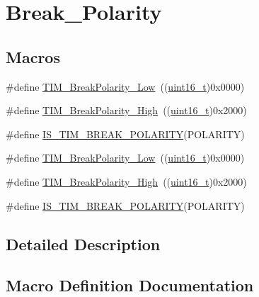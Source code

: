 \hypertarget{group___break___polarity}{}\section{Break\+\_\+\+Polarity}
\label{group___break___polarity}
\subsection*{Macros}
\begin{DoxyCompactItemize}
\item 
\#define \hyperlink{group___break___polarity_ga565656ca81d17f9a1807afe3971dff6e}{T\+I\+M\+\_\+\+Break\+Polarity\+\_\+\+Low}~((\hyperlink{_p_e___types_8h_a1f1825b69244eb3ad2c7165ddc99c956}{uint16\+\_\+t})0x0000)
\item 
\#define \hyperlink{group___break___polarity_gabd4b72079548fd8903413a348539542b}{T\+I\+M\+\_\+\+Break\+Polarity\+\_\+\+High}~((\hyperlink{_p_e___types_8h_a1f1825b69244eb3ad2c7165ddc99c956}{uint16\+\_\+t})0x2000)
\item 
\#define \hyperlink{group___break___polarity_gaa29e33e74c5ff10972357ddd3f47f078}{I\+S\+\_\+\+T\+I\+M\+\_\+\+B\+R\+E\+A\+K\+\_\+\+P\+O\+L\+A\+R\+I\+TY}(P\+O\+L\+A\+R\+I\+TY)
\item 
\#define \hyperlink{group___break___polarity_ga565656ca81d17f9a1807afe3971dff6e}{T\+I\+M\+\_\+\+Break\+Polarity\+\_\+\+Low}~((\hyperlink{_p_e___types_8h_a1f1825b69244eb3ad2c7165ddc99c956}{uint16\+\_\+t})0x0000)
\item 
\#define \hyperlink{group___break___polarity_gabd4b72079548fd8903413a348539542b}{T\+I\+M\+\_\+\+Break\+Polarity\+\_\+\+High}~((\hyperlink{_p_e___types_8h_a1f1825b69244eb3ad2c7165ddc99c956}{uint16\+\_\+t})0x2000)
\item 
\#define \hyperlink{group___break___polarity_gaa29e33e74c5ff10972357ddd3f47f078}{I\+S\+\_\+\+T\+I\+M\+\_\+\+B\+R\+E\+A\+K\+\_\+\+P\+O\+L\+A\+R\+I\+TY}(P\+O\+L\+A\+R\+I\+TY)
\end{DoxyCompactItemize}


\subsection{Detailed Description}


\subsection{Macro Definition Documentation}
